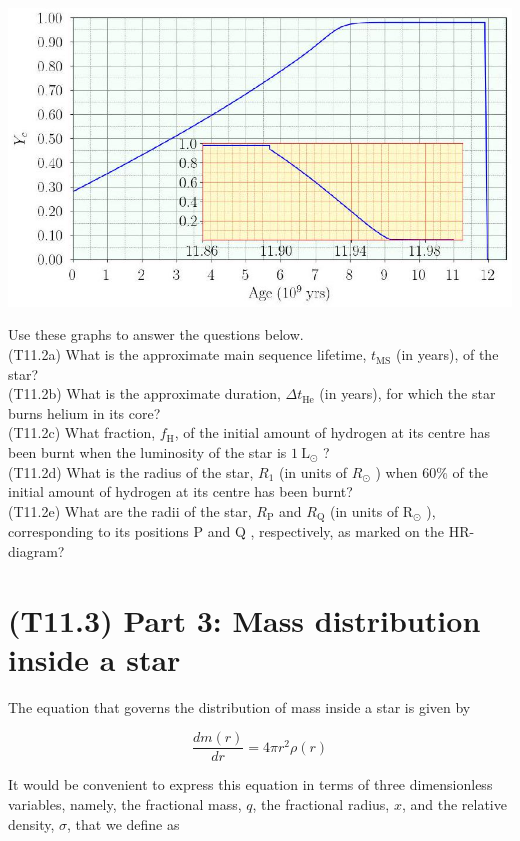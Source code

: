 \documentclass[10pt]{article}
\begin{document}
    \includegraphics[max width=\textwidth, center]{2025_08_23_e94579452776a99c4850g-15(1)}
    
    Use these graphs to answer the questions below.\\
    (T11.2a) What is the approximate main sequence lifetime, $t_{\mathrm{MS}}$ (in years), of the star?\\
    (T11.2b) What is the approximate duration, $\Delta t_{\mathrm{He}}$ (in years), for which the star burns helium in its core?\\
    (T11.2c) What fraction, $f_{\mathrm{H}}$, of the initial amount of hydrogen at its centre has been burnt when the luminosity of the star is $1 \mathrm{~L}_{\odot}$ ?\\
    (T11.2d) What is the radius of the star, $R_{1}$ (in units of $R_{\odot}$ ) when $60 \%$ of the initial amount of hydrogen at its centre has been burnt?\\
    (T11.2e) What are the radii of the star, $R_{\mathrm{P}}$ and $R_{\mathrm{Q}}$ (in units of $\mathrm{R}_{\odot}$ ), corresponding to its positions P and Q , respectively, as marked on the HR-diagram?
    
    \section*{(T11.3) Part 3: Mass distribution inside a star}
    The equation that governs the distribution of mass inside a star is given by
    
    $$
    \frac{d m(r)}{d r}=4 \pi r^{2} \rho(r)
    $$
    
    It would be convenient to express this equation in terms of three dimensionless variables, namely, the fractional mass, $q$, the fractional radius, $x$, and the relative density, $\sigma$, that we define as
    
\end{document}
